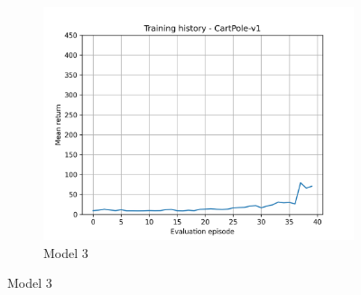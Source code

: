\documentclass[a4paper,10pt]{article}
\begin{document}
\begin{figure}[htbp]
\begin{subfigure}{0.3\textwidth}
    \includegraphics[width=\textwidth]{figures/CartPole_history_3.png}
    \caption{Model 3}
    \label{fig:image3}
  \end{subfigure}
  \label{fig:all_images}

  \vfill



\end{figure}
\end{document}
